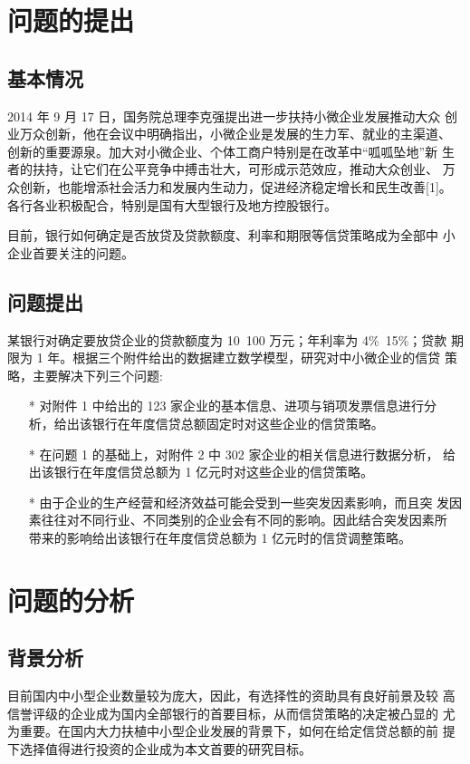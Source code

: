 \documentclass{article}
\begin{document}
\section{问题的提出}
\subsection{基本情况}
2014 年 9 月 17 日，国务院总理李克强提出进一步扶持小微企业发展推动大众
创业万众创新，他在会议中明确指出，小微企业是发展的生力军、就业的主渠道、
创新的重要源泉。加大对小微企业、个体工商户特别是在改革中“呱呱坠地”新
生者的扶持，让它们在公平竞争中搏击壮大，可形成示范效应，推动大众创业、
万众创新，也能增添社会活力和发展内生动力，促进经济稳定增长和民生改善[1]。
各行各业积极配合，特别是国有大型银行及地方控股银行。\par
目前，银行如何确定是否放贷及贷款额度、利率和期限等信贷策略成为全部中
小企业首要关注的问题。
\subsection{问题提出}
某银行对确定要放贷企业的贷款额度为 10~100 万元；年利率为 4\%~15\%；贷款
期限为 1 年。根据三个附件给出的数据建立数学模型，研究对中小微企业的信贷
策略，主要解决下列三个问题:
\begin{itemize}
    \item [*] 对附件 1 中给出的 123 家企业的基本信息、进项与销项发票信息进行分
    析，给出该银行在年度信贷总额固定时对这些企业的信贷策略。
    \item [*] 在问题 1 的基础上，对附件 2 中 302 家企业的相关信息进行数据分析，
    给出该银行在年度信贷总额为 1 亿元时对这些企业的信贷策略。
    \item [*] 由于企业的生产经营和经济效益可能会受到一些突发因素影响，而且突
    发因素往往对不同行业、不同类别的企业会有不同的影响。因此结合突发因素所
    带来的影响给出该银行在年度信贷总额为 1 亿元时的信贷调整策略。
\end{itemize}
\section{问题的分析}
\subsection{背景分析}
    目前国内中小型企业数量较为庞大，因此，有选择性的资助具有良好前景及较
高信誉评级的企业成为国内全部银行的首要目标，从而信贷策略的决定被凸显的
尤为重要。在国内大力扶植中小型企业发展的背景下，如何在给定信贷总额的前
提下选择值得进行投资的企业成为本文首要的研究目标。
\end{document}
